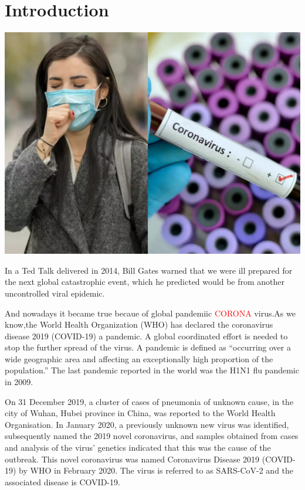 \documentclass[12pt]{article}
\begin{document}
\section{Introduction}
\includegraphics[width=\textwidth]{Intro.jpeg}\\
[2 cm]
\par 
In a Ted Talk delivered in 2014, Bill Gates warned that we were ill prepared for the next global catastrophic event, which he predicted would be from another uncontrolled viral epidemic.\\
\par And nowadays it became true becaue of global pandemiic \textcolor{red}{CORONA} virus.As we know,the World Health Organization (WHO) has declared the coronavirus disease 2019 (COVID-19) a pandemic. A global coordinated effort is needed to stop the further spread of the virus. A pandemic is defined as “occurring over a wide geographic area and affecting an exceptionally high proportion of the population.” The last pandemic reported in the world was the H1N1 flu pandemic in 2009.\cite{nj1}
\\
\par On 31 December 2019, a cluster of cases of pneumonia of unknown cause, in the city of Wuhan, Hubei province in China, was reported to the World Health Organisation. In January 2020, a previously unknown new virus was identified, subsequently named the 2019 novel coronavirus, and samples obtained from cases and analysis of the virus’ genetics indicated that this was the cause of the outbreak. This novel coronavirus was named Coronavirus Disease 2019 (COVID-19) by WHO in February 2020. The virus is referred to as SARS-CoV-2 and the associated disease is COVID-19.\cite{nj1}\\
\end{document}
